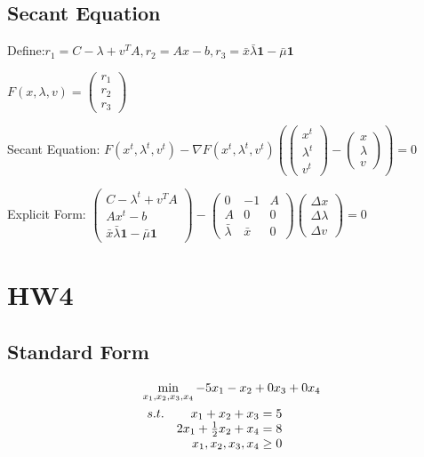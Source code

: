 \documentclass{xjtureport}
\begin{document}
\subsection{Secant Equation}
Define:$r_{1} = C-\lambda + v^{T}A,r_{2} = Ax -b,r_{3} =  \bar{x}\bar{\lambda}\textbf{1}- \bar{\mu}\textbf{1}$

$F(x,\lambda, v) = \begin{pmatrix}
    r_{1}\\ 
    r_{2}\\ 
    r_{3}
    \end{pmatrix}$

Secant Equation:
$F(x^{t},\lambda^{t},v^{t}) - \nabla F(x^{t},\lambda^{t},v^{t})(\begin{pmatrix}x^{t}\\ \lambda ^{t}\\ v^{t} \end{pmatrix} - \begin{pmatrix}x\\ \lambda \\ v \end{pmatrix}) = 0$

Explicit Form:
$\begin{pmatrix} C-\lambda ^{t} +v^{T}A\\ Ax^{t} - b\\ \bar{x}\bar{\lambda}\textbf{1} - \bar{\mu} \textbf{1}\end{pmatrix} - \begin{pmatrix} 0 & -1 & A\\ A &0  &0 \\  \bar{\lambda} &\bar{x}  &0 \end{pmatrix}\begin{pmatrix} \Delta x\\ \Delta \lambda \\ \Delta v \end{pmatrix} = 0$
\section{HW4}
\subsection{Standard Form}

\begin{equation}
    \begin{aligned} \label{P}
        & \min_{x_{1},x_{2},x_{3},x_{4}} -5x_{1}-x_{2}+0x_{3}+0x_{4}\\
        &\begin{array}[]{r@{\quad}r@{}l@{\quad}l}
        s.t.& x_{1} + x_{2} + x_{3} = 5\\
            &2x_{1} + \frac{1}{2} x_{2} + x_{4} = 8\\
            &x_1, x_2,x_3, x_4 \geq 0
        \end{array}
    \end{aligned}
\end{equation}
\end{document}

